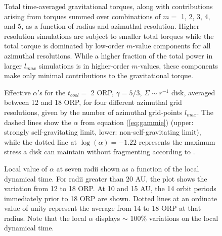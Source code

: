 \documentclass[manuscript]{aastex}
\begin{document}
\begin{figure}
\caption
{
Total time-averaged gravitational  torques, along with contributions arising from torques
summed over combinations of  $m = $ 1, 2, 3, 4, and 5,
as a function of radius and azimuthal resolution. 
Higher resolution simulations are subject to smaller total torques while the total torque is dominated by low-order $m$-value
components for all azimuthal resolutions.  While a higher fraction of the total power in larger $l_{max}$ simulations is in higher-order $m$-values, these components make only minimal contributions to the gravitational torque. 
}
\label{fig:torquearray}
\end{figure}


\begin{figure}
\caption
{Effective $\alpha$'s for the $t_{cool} =$ 2 ORP, $\gamma = 5/3$, $\Sigma \sim r^{ -1}$ disk, averaged between 12 and 18
  ORP, for four different azimuthal grid resolutions, given by the number of azimuthal grid-points $l_{max}$. The
  dashed lines show the $\alpha$ from equation (\ref{eq:gammie}) (upper: strongly self-gravitating limit, lower:
  non-self-gravitating limit), while the dotted line at $\log(\alpha) = -1.22$ represents the maximum stress a disk can
  maintain without fragmenting according to \citet{rice2005}. 
}
\label{fig:alpha_v_radius}
\end{figure}
\newpage

\begin{figure}
\caption{
Local value of $\alpha$ at seven radii shown as a function of the local dynamical time.  For radii greater than 20 AU, the plot shows 
the variation from 12 to 18 ORP.  At 10 and 15 AU, the 14 orbit periods immediately prior to 18 ORP are shown.
Dotted lines at an ordinate value of unity represent the average from 14 to 18 ORP at that radius.
Note that the local $\alpha$ displays $\sim$ 100\% variations on the local dynamical time. 
}
\label{fig:alphavar}
\end{figure}
\end{document}
